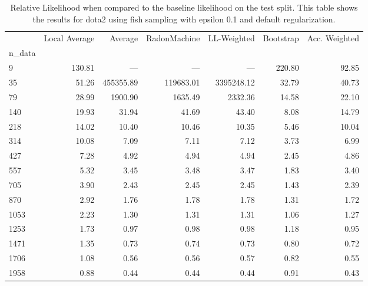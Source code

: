 \begin{table}
\centering
\caption{Relative Likelihood when compared to the baseline likelihood on the test split. This table shows the results for  dota2 using  fish sampling with epsilon  0.1 and  default regularization.}
\label{tab:8}
\begin{tabular}{lrrrrrr}
\toprule
{} &  Local Average &   Average &  RadonMachine &  LL-Weighted &  Bootstrap &  Acc. Weighted \\
n\_data &                &           &               &              &            &                \\
\midrule
9      &         130.81 &       --- &           --- &          --- &     220.80 &          92.85 \\
35     &          51.26 & 455355.89 &     119683.01 &   3395248.12 &      32.79 &          40.73 \\
79     &          28.99 &   1900.90 &       1635.49 &      2332.36 &      14.58 &          22.10 \\
140    &          19.93 &     31.94 &         41.69 &        43.40 &       8.08 &          14.79 \\
218    &          14.02 &     10.40 &         10.46 &        10.35 &       5.46 &          10.04 \\
314    &          10.08 &      7.09 &          7.11 &         7.12 &       3.73 &           6.99 \\
427    &           7.28 &      4.92 &          4.94 &         4.94 &       2.45 &           4.86 \\
557    &           5.32 &      3.45 &          3.48 &         3.47 &       1.83 &           3.40 \\
705    &           3.90 &      2.43 &          2.45 &         2.45 &       1.43 &           2.39 \\
870    &           2.92 &      1.76 &          1.78 &         1.78 &       1.31 &           1.72 \\
1053   &           2.23 &      1.30 &          1.31 &         1.31 &       1.06 &           1.27 \\
1253   &           1.73 &      0.97 &          0.98 &         0.98 &       1.18 &           0.95 \\
1471   &           1.35 &      0.73 &          0.74 &         0.73 &       0.80 &           0.72 \\
1706   &           1.08 &      0.56 &          0.56 &         0.57 &       0.82 &           0.55 \\
1958   &           0.88 &      0.44 &          0.44 &         0.44 &       0.91 &           0.43 \\
\bottomrule
\end{tabular}
\end{table}

